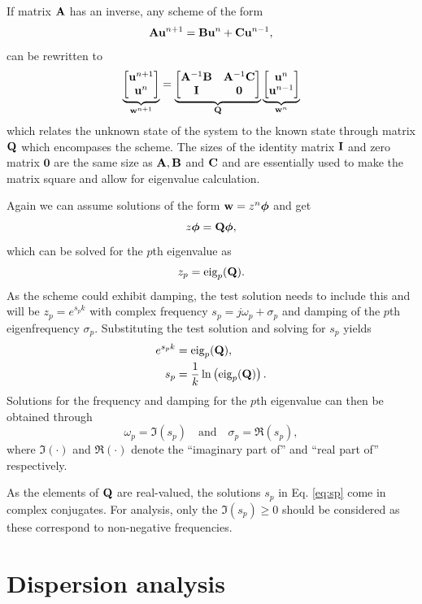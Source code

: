 If matrix $\mathbf{A}$ has an inverse, any scheme of the form
\begin{equation}
    \mathbf{A}\mathbf{u}^{n+1}=\mathbf{B}\mathbf{u}^n + \mathbf{C}\mathbf{u}^{n-1},
\end{equation}
can be rewritten to
\begin{equation}\label{eq:oneStepForm}
    \underbrace{\begin{bmatrix}
        \mathbf{u}^{n+1}\\
        \mathbf{u}^n
    \end{bmatrix}}_{\mathbf{w}^{n+1}} = 
    \underbrace{\begin{bmatrix}
        \mathbf{A}^{-1}\mathbf{B} & \mathbf{A}^{-1}\mathbf{C}\\
        \mathbf{I} & \mathbf{0}
    \end{bmatrix}}_{\mathbf{Q}}
    \underbrace{\begin{bmatrix}
        \mathbf{u}^n\\
        \mathbf{u}^{n-1}
    \end{bmatrix}}_{\mathbf{w}^n}
\end{equation}
which relates the unknown state of the system to the known state through matrix $\mathbf{Q}$ which encompases the scheme. The sizes of the identity matrix $\mathbf{I}$ and zero matrix $\mathbf{0}$ are the same size as $\mathbf{A}, \mathbf{B}$ and $\mathbf{C}$ and are essentially used to make the matrix square and allow for eigenvalue calculation.

Again we can assume solutions of the form $\mathbf{w} = z^n\boldsymbol{\phi}$  and get
\begin{equation}
    z\boldsymbol{\phi} = \mathbf{Q}\boldsymbol{\phi} ,
\end{equation}
which can be solved for the $p$th eigenvalue as
\begin{equation}
    z_p = \text{eig}_p(\mathbf{Q}).
\end{equation}
As the scheme could exhibit damping, the test solution needs to include this and will be $z_p = e^{s_pk}$ with complex frequency $s_p= j\omega_p + \sigma_p$ and damping of the $p$th eigenfrequency $\sigma_p$. Substituting the test solution and solving for $s_p$ yields
\begin{align}
    e^{s_pk} &= \text{eig}_p(\mathbf{Q}),\nonumber\\
    s_p &= \frac{1}{k}\ln \left(\text{eig}_p(\mathbf{Q})\right).\label{eq:sp}
\end{align}
Solutions for the frequency and damping for the $p$th eigenvalue can then be obtained through
\begin{equation}
    \omega_p = \mathfrak{I}(s_p) \quad \text{and} \quad \sigma_p = \mathfrak{R}(s_p),
\end{equation}
where $\mathfrak{I}(\cdot)$ and $\mathfrak{R}(\cdot)$ denote the ``imaginary part of'' and ``real part of'' respectively. 

As the elements of $\mathbf{Q}$ are real-valued, the solutions $s_p$ in Eq. \eqref{eq:sp} come in complex conjugates. For analysis, only the $\mathfrak{I}(s_p)\geq 0$ should be considered as these correspond to non-negative frequencies.

\section{Dispersion analysis}\label{sec:dispersionAnalysis}
